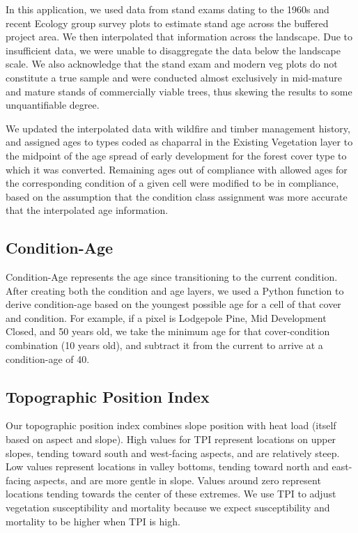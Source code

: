 In this application, we used data from stand exams dating to the 1960s and recent Ecology group survey plots to estimate stand age across the buffered project area. We then interpolated that information across the landscape. Due to insufficient data, we were unable to disaggregate the data below the landscape scale. We also acknowledge that the stand exam and modern veg plots do not constitute a true sample and were conducted almost exclusively in mid-mature and mature stands of commercially viable trees, thus skewing the results to some unquantifiable degree.

We updated the interpolated data with wildfire and timber management history, and assigned ages to types coded as chaparral in the Existing Vegetation layer to the midpoint of the age spread of early development for the forest cover type to which it was converted. Remaining ages out of compliance with allowed ages for the corresponding condition of a given cell were modified to be in compliance, based on the assumption that the condition class assignment was more accurate that the interpolated age information.

\subsection{Condition-Age}
Condition-Age represents the age since transitioning to the current condition. After creating both the condition and age layers, we used a Python function to derive condition-age based on the youngest possible age for a cell of that cover and condition. For example, if a pixel is Lodgepole Pine, Mid Development Closed, and 50 years old, we take the minimum age for that cover-condition combination (10 years old), and subtract it from the current to arrive at a condition-age of 40. 

\subsection{Topographic Position Index}
Our topographic position index combines slope position with heat load (itself based on aspect and slope). High values for TPI represent locations on upper slopes, tending toward south and west-facing aspects, and are relatively steep. Low values represent locations in valley bottoms, tending toward north and east-facing aspects, and are more gentle in slope. Values around zero represent locations tending towards the center of these extremes. We use TPI to adjust vegetation susceptibility and mortality because we expect susceptibility and mortality to be higher when TPI is high.

